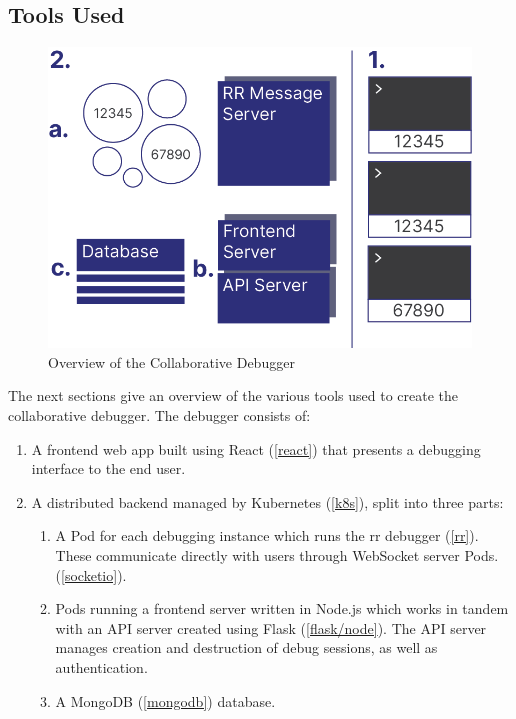 \documentclass[12pt]{article}
\begin{document}
\subsection{Tools Used}

\begin{figure}[h!]

  \includegraphics[scale=.8]{overall_system}
  \centering
  \caption{Overview of the Collaborative Debugger}
  \label{debugger:overview}
\end{figure}

The next sections give an overview of the various tools used to create
the collaborative debugger.  The debugger consists of:

\begin{enumerate}
\item A frontend web app built using React (\ref{react}) that presents a debugging
  interface to the end user.
\item A distributed backend managed by Kubernetes (\ref{k8s}), split into three parts:
  \begin{enumerate}
  \item A Pod for each debugging instance which runs the rr debugger
    (\ref{rr}).  These communicate directly with users through
    WebSocket server Pods. (\ref{socketio}).
  \item Pods running a frontend server written in Node.js which works
    in tandem with an API server created using Flask
    (\ref{flask/node}).  The API server manages creation and
    destruction of debug sessions, as well as authentication.
  \item A MongoDB (\ref{mongodb}) database.
  \end{enumerate}
\end{enumerate}
\end{document}
